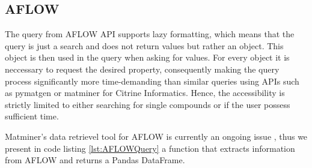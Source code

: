 

\subsection{AFLOW}

The query from AFLOW API \cite{Curtarolo2012} supports lazy formatting, which means that the query is just a search and does not return values but rather an object. This object is then used in the query when asking for values. For every object it is neccessary to request the desired property, consequently making the query process significantly more time-demanding than similar queries using APIs such as pymatgen or matminer for Citrine Informatics. Hence, the accessibility is strictly limited to either searching for single compounds or if the user possess sufficient time.

Matminer's data retrievel tool for AFLOW is currently an ongoing issue \cite{Rosenbrock2017}, thus we present in code listing \ref{lst:AFLOWQuery} a function that extracts information from AFLOW and returns a Pandas DataFrame.


